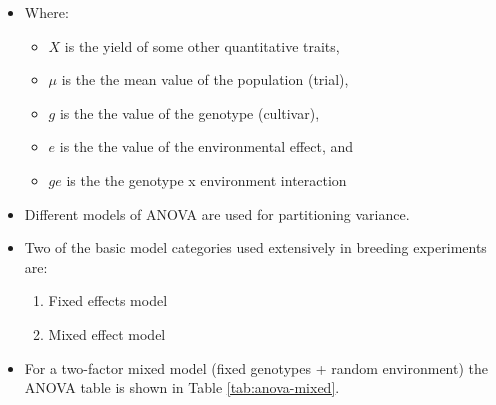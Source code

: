 \documentclass[11pt,dvipsnames,ignorenonframetext,aspectratio=169]{beamer}
\providecommand{\tightlist}{%
  \setlength{\itemsep}{0pt}\setlength{\parskip}{0pt}}
\begin{document}
\begin{frame}{}
\protect\hypertarget{section-5}{}
\begin{itemize}
\tightlist
\item
  Where:

  \begin{itemize}
  \tightlist
  \item
    \(X\) is the yield of some other quantitative traits,
  \item
    \(\mu\) is the the mean value of the population (trial),
  \item
    \(g\) is the the value of the genotype (cultivar),
  \item
    \(e\) is the the value of the environmental effect, and
  \item
    \(ge\) is the the genotype x environment interaction
  \end{itemize}
\end{itemize}
\end{frame}

\begin{frame}{}
\protect\hypertarget{section-6}{}
\begin{itemize}
\tightlist
\item
  Different models of ANOVA are used for partitioning variance.
\item
  Two of the basic model categories used extensively in breeding
  experiments are:

  \begin{enumerate}
  \tightlist
  \item
    Fixed effects model
  \item
    Mixed effect model
  \end{enumerate}
\item
  For a two-factor mixed model (fixed genotypes + random environment)
  the ANOVA table is shown in Table \ref{tab:anova-mixed}.
\end{itemize}
\end{frame}
\end{document}

